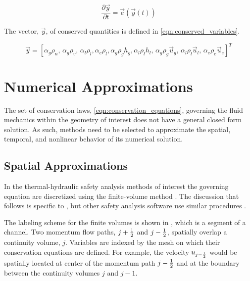 \begin{equation}
\label{eqn:conservation_equations}
\frac{\partial \vec{y} }{\partial t} = \vec{e}(\vec{y}(t))
\end{equation}

The vector, $\vec{y}$, of conserved quantities is defined in \eqref{eqn:conserved_variables}.

\begin{equation}
\label{eqn:conserved_variables}
\vec{y} = [\alpha_g \rho_n,\, \alpha_g \rho_v,\, \alpha_l \rho_l, \alpha_e \rho_l, \alpha_g \rho_g h_g, \alpha_l \rho_l h_l,\, \alpha_g \rho_g \vec{u}_g,\, \alpha_l \rho_l \vec{u}_l,\, \alpha_e \rho_e \vec{u}_e]^{T}
\end{equation}

\section{Numerical Approximations}
\label{sect:numeric_approximation}
The set of conservation laws, \eqref{eqn:conservation_equations}, governing the fluid mechanics within the geometry of interest does not have a general closed form solution.
As such, methods need to be selected to approximate the spatial, temporal, and nonlinear behavior of its numerical solution.

\subsection{Spatial Approximations}
\label{subsect:spatial_approx}
In the thermal-hydraulic safety analysis methods of interest the governing equation are discretized using the finite-volume method \cite{LeVeque2002}.
The discussion that follows is specific to \cobra{}, but other safety analysis software use similar procedures \cite{RELAP,TRACE}.

The labeling scheme for the finite volumes is shown in , which is a segment of a channel.
Two momentum flow paths, $j + \onehalf $ and $j - \onehalf$, spatially overlap a continuity volume, $j$.
Variables are indexed by the mesh on which their conservation equations are defined.
For example, the velocity $u_{j - \onehalf}$ would be spatially located at center of the momentum path $j - \onehalf $ and at the boundary between the continuity volumes $j$ and $j-1$.

